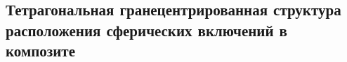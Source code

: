 %


%

\subsection{Тетрагональная гранецентрированная структура расположения сферических включений в композите}

